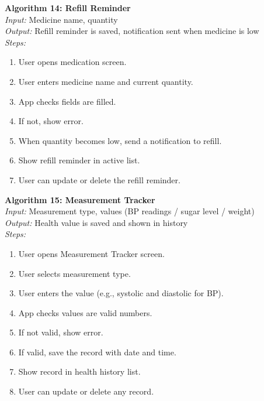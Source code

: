 \textbf{Algorithm 14: Refill Reminder}\\
\textit{Input:} Medicine name, quantity\\
\textit{Output:} Refill reminder is saved, notification sent when medicine is low\\
\textit{Steps:}
\begin{enumerate}
    \item User opens medication screen.
    \item User enters medicine name and current quantity.
    \item App checks fields are filled.
    \item If not, show error.
    \item When quantity becomes low, send a notification to refill.
    \item Show refill reminder in active list.
    \item User can update or delete the refill reminder.
\end{enumerate}

\textbf{Algorithm 15: Measurement Tracker}\\
\textit{Input:} Measurement type, values (BP readings / sugar level / weight)\\
\textit{Output:} Health value is saved and shown in history\\
\textit{Steps:}
\begin{enumerate}
    \item User opens Measurement Tracker screen.
    \item User selects measurement type.
    \item User enters the value (e.g., systolic and diastolic for BP).
    \item App checks values are valid numbers.
    \item If not valid, show error.
    \item If valid, save the record with date and time.
    \item Show record in health history list.
    \item User can update or delete any record.
\end{enumerate}

